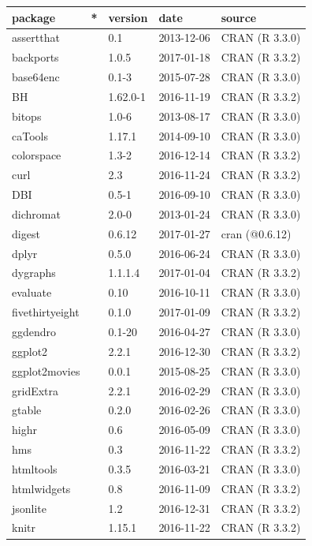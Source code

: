 \documentclass[]{tufte-book}
\begin{document}
\begin{longtable}{lllll}
\toprule
package & * & version & date & source\\
\midrule
assertthat &  & 0.1 & 2013-12-06 & CRAN (R 3.3.0)\\
backports &  & 1.0.5 & 2017-01-18 & CRAN (R 3.3.2)\\
base64enc &  & 0.1-3 & 2015-07-28 & CRAN (R 3.3.0)\\
BH &  & 1.62.0-1 & 2016-11-19 & CRAN (R 3.3.2)\\
bitops &  & 1.0-6 & 2013-08-17 & CRAN (R 3.3.0)\\
\addlinespace
caTools &  & 1.17.1 & 2014-09-10 & CRAN (R 3.3.0)\\
colorspace &  & 1.3-2 & 2016-12-14 & CRAN (R 3.3.2)\\
curl &  & 2.3 & 2016-11-24 & CRAN (R 3.3.2)\\
DBI &  & 0.5-1 & 2016-09-10 & CRAN (R 3.3.0)\\
dichromat &  & 2.0-0 & 2013-01-24 & CRAN (R 3.3.0)\\
\addlinespace
digest &  & 0.6.12 & 2017-01-27 & cran (@0.6.12)\\
dplyr &  & 0.5.0 & 2016-06-24 & CRAN (R 3.3.0)\\
dygraphs &  & 1.1.1.4 & 2017-01-04 & CRAN (R 3.3.2)\\
evaluate &  & 0.10 & 2016-10-11 & CRAN (R 3.3.0)\\
fivethirtyeight &  & 0.1.0 & 2017-01-09 & CRAN (R 3.3.2)\\
\addlinespace
ggdendro &  & 0.1-20 & 2016-04-27 & CRAN (R 3.3.0)\\
ggplot2 &  & 2.2.1 & 2016-12-30 & CRAN (R 3.3.2)\\
ggplot2movies &  & 0.0.1 & 2015-08-25 & CRAN (R 3.3.0)\\
gridExtra &  & 2.2.1 & 2016-02-29 & CRAN (R 3.3.0)\\
gtable &  & 0.2.0 & 2016-02-26 & CRAN (R 3.3.0)\\
\addlinespace
highr &  & 0.6 & 2016-05-09 & CRAN (R 3.3.0)\\
hms &  & 0.3 & 2016-11-22 & CRAN (R 3.3.2)\\
htmltools &  & 0.3.5 & 2016-03-21 & CRAN (R 3.3.0)\\
htmlwidgets &  & 0.8 & 2016-11-09 & CRAN (R 3.3.2)\\
jsonlite &  & 1.2 & 2016-12-31 & CRAN (R 3.3.2)\\
\addlinespace
knitr &  & 1.15.1 & 2016-11-22 & CRAN (R 3.3.2)\\

\end{longtable}
\end{document}
